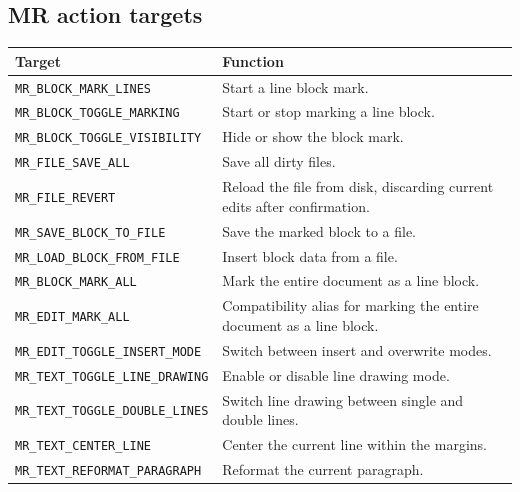 \documentclass[a4paper,10pt,twoside,openany]{book}
\newenvironment{mrmacextension}{\begin{changebar}}{\end{changebar}}
\begin{document}
\begin{mrmacextension}
\section{MR action targets}
\begin{longtable}{@{}L{0.50\textwidth}@{\hspace{0.8em}}L{0.40\textwidth}@{}}
\toprule
Target & Function \\
\midrule
\endhead
\texttt{MR\_BLOCK\_MARK\_LINES} & Start a line block mark. \\
\texttt{MR\_BLOCK\_TOGGLE\_MARKING} & Start or stop marking a line block. \\
\texttt{MR\_BLOCK\_TOGGLE\_VISIBILITY} & Hide or show the block mark. \\
\texttt{MR\_FILE\_SAVE\_ALL} & Save all dirty files. \\
\texttt{MR\_FILE\_REVERT} & Reload the file from disk, discarding current edits after confirmation. \\
\texttt{MR\_SAVE\_BLOCK\_TO\_FILE} & Save the marked block to a file. \\
\texttt{MR\_LOAD\_BLOCK\_FROM\_FILE} & Insert block data from a file. \\
\texttt{MR\_BLOCK\_MARK\_ALL} & Mark the entire document as a line block. \\
\texttt{MR\_EDIT\_MARK\_ALL} & Compatibility alias for marking the entire document as a line block. \\
\texttt{MR\_EDIT\_TOGGLE\_INSERT\_MODE} & Switch between insert and overwrite modes. \\
\texttt{MR\_TEXT\_TOGGLE\_LINE\_DRAWING} & Enable or disable line drawing mode. \\
\texttt{MR\_TEXT\_TOGGLE\_DOUBLE\_LINES} & Switch line drawing between single and double lines. \\
\texttt{MR\_TEXT\_CENTER\_LINE} & Center the current line within the margins. \\
\texttt{MR\_TEXT\_REFORMAT\_PARAGRAPH} & Reformat the current paragraph. \\

\end{longtable}
\end{mrmacextension}
\end{document}
